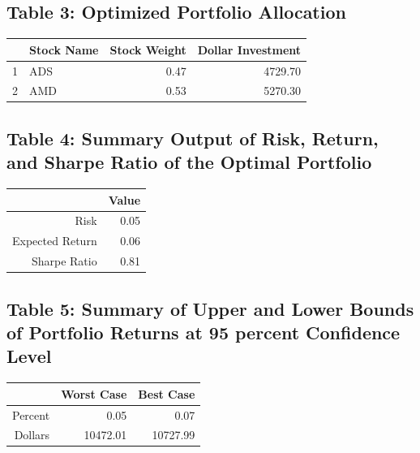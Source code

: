 \documentclass[12pt,english]{article}
\begin{document}
        \subsection{Table 3: Optimized Portfolio Allocation}
                \begin{table}[H]
                \centering
                \begin{tabular}{rlrr}
                  \hline
                 & Stock Name & Stock Weight & Dollar Investment \\ 
                  \hline
                1 & ADS & 0.47 & 4729.70 \\ 
                  2 & AMD & 0.53 & 5270.30 \\ 
                   \hline
                \end{tabular}
                \end{table}
                
        \subsection{Table 4: Summary Output of Risk, Return, and Sharpe Ratio of the Optimal Portfolio}
                \begin{table}[H]
                \centering
                \begin{tabular}{rr}
                  \hline
                 & Value \\ 
                  \hline
                Risk & 0.05 \\ 
                  Expected Return & 0.06 \\ 
                  Sharpe Ratio & 0.81 \\ 
                   \hline
                \end{tabular}
                \end{table}
                
        \subsection{Table 5: Summary of Upper and Lower Bounds of Portfolio Returns at 95 percent Confidence Level}
                \begin{table}[H]
                \centering
                \begin{tabular}{rrr}
                  \hline
                 & Worst Case & Best Case \\ 
                  \hline
                Percent & 0.05 & 0.07 \\ 
                  Dollars & 10472.01 & 10727.99 \\ 
                   \hline
                \end{tabular}
                \end{table}
    
\end{document}

